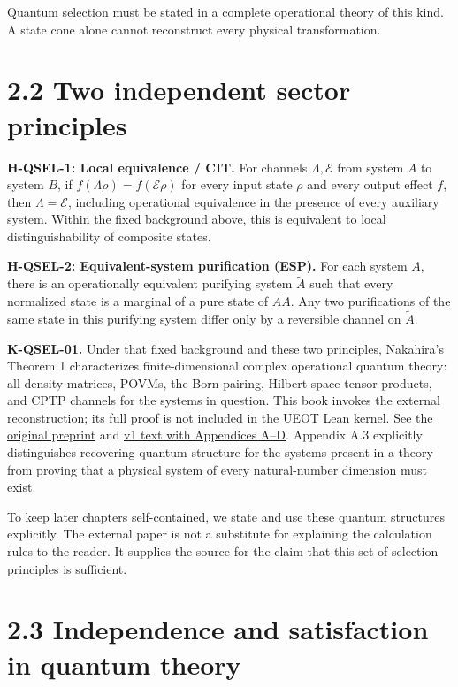 \documentclass[
  11pt,
  oneside]{book}
\begin{document}
Quantum selection must be stated in a complete operational theory of
this kind. A state cone alone cannot reconstruct every physical
transformation.

\section{2.2 Two independent sector principles}

\textbf{H-QSEL-1: Local equivalence / CIT.} For channels
\(\Lambda,\mathcal E\) from system \(A\) to system \(B\), if
\(f(\Lambda\rho)=f(\mathcal E\rho)\) for every input state \(\rho\) and
every output effect \(f\), then \(\Lambda=\mathcal E\), including
operational equivalence in the presence of every auxiliary system.
Within the fixed background above, this is equivalent to local
distinguishability of composite states.

\textbf{H-QSEL-2: Equivalent-system purification (ESP).} For each system
\(A\), there is an operationally equivalent purifying system
\(\widetilde A\) such that every normalized state is a marginal of a
pure state of \(A\widetilde A\). Any two purifications of the same state
in this purifying system differ only by a reversible channel on
\(\widetilde A\).

\textbf{K-QSEL-01.} Under that fixed background and these two
principles, Nakahira's Theorem 1 characterizes finite-dimensional
complex operational quantum theory: all density matrices, POVMs, the
Born pairing, Hilbert-space tensor products, and CPTP channels for the
systems in question. This book invokes the external reconstruction; its
full proof is not included in the UEOT Lean kernel. See the
\href{https://arxiv.org/abs/2605.23217}{original preprint} and
\href{https://arxiv.org/html/2605.23217v1}{v1 text with Appendices
A--D}. Appendix A.3 explicitly distinguishes recovering quantum
structure for the systems present in a theory from proving that a
physical system of every natural-number dimension must exist.

To keep later chapters self-contained, we state and use these quantum
structures explicitly. The external paper is not a substitute for
explaining the calculation rules to the reader. It supplies the source
for the claim that this set of selection principles is sufficient.

\section{2.3 Independence and satisfaction in quantum theory}
\end{document}
